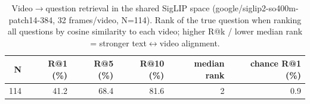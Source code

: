 \begin{table}[t]
\centering
\small
\caption{Video$\to$question retrieval in the shared SigLIP space (google/siglip2-so400m-patch14-384, 32 frames/video, N=114). Rank of the true question when ranking all questions by cosine similarity to each video; higher R@k / lower median rank = stronger text$\leftrightarrow$video alignment.}
\label{tab:vt_retrieval}
\begin{tabular}{rrrrrr}
\toprule
N & R@1 (\%) & R@5 (\%) & R@10 (\%) & median rank & chance R@1 (\%) \\
\midrule
114 & 41.2 & 68.4 & 81.6 & 2 & 0.9 \\
\bottomrule
\end{tabular}
\end{table}
